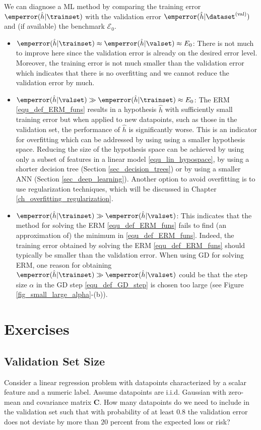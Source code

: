 \documentclass[12pt]{report}
\begin{document}
We can diagnose a ML method by comparing the training error $\emperror(\hat{h}| \trainset)$ 
with the validation error $\emperror(\hat{h}| \dataset^{(\rm val)})$ and (if available) the benchmark $\mathcal{E}_{0}$.
\begin{itemize} 
\item $\emperror(\hat{h}| \trainset) \approx \emperror(\hat{h}| \valset) \approx E_{0}$: 
There is not much to improve here since the validation error is already on the 
desired error level. Moreover, the training error is not much smaller than 
the validation error which indicates that there is no overfitting and we cannot 
reduce the validation error by much. 
\item $\emperror(\hat{h}| \valset) \gg \emperror(\hat{h}| \trainset) \approx E_{0}$: 
The ERM \eqref{equ_def_ERM_funs} results in a hypothesis $\hat{h}$ 
with sufficiently small training error but when applied to new datapoints, 
such as those in the validation set, the performance of $\hat{h}$ is significantly worse. 
This is an indicator for overfitting which can be addressed by using using a smaller 
hypothesis space. Reducing the size of the hypothesis space can be 
achieved by using only a subset of features in a linear model \eqref{equ_lin_hypospace}, 
by using a shorter decision tree (Section \ref{sec_decision_trees}) or by using a smaller ANN (Section \ref{sec_deep_learning}). 
Another option to avoid overfitting is to use 
regularization techniques, which will be discussed in Chapter \ref{ch_overfitting_regularization}. 
\item $\emperror(\hat{h}| \trainset) \gg \emperror(\hat{h}| \valset)$: 
This indicates that the method for solving the ERM \eqref{equ_def_ERM_funs} 
fails to find (an approximation of) the minimum in \eqref{equ_def_ERM_funs}. 
Indeed, the training error obtained by solving the ERM \eqref{equ_def_ERM_funs} should 
typically be smaller than the validation error. When using GD for solving ERM, 
one reason for obtaining $\emperror(\hat{h}| \trainset) \gg \emperror(\hat{h}| \valset)$ could be that 
the step size $\alpha$ in the GD step \eqref{equ_def_GD_step} is chosen too large 
(see Figure \ref{fig_small_large_alpha}-(b)). 
\end{itemize}

\section{Exercises} 

\subsection{Validation Set Size} 
Consider a linear regression problem with datapoints characterized 
by a scalar feature and a numeric label. Assume datapoints are i.i.d. 
Gaussian with zero-mean and covariance matrix $\mathbf{C}$. How 
many datapoints do we need to include in the validation set such 
that with probability of at least $0.8$ the validation error does 
not deviate by more than $20$ percent from the expected loss or risk?
\end{document}
